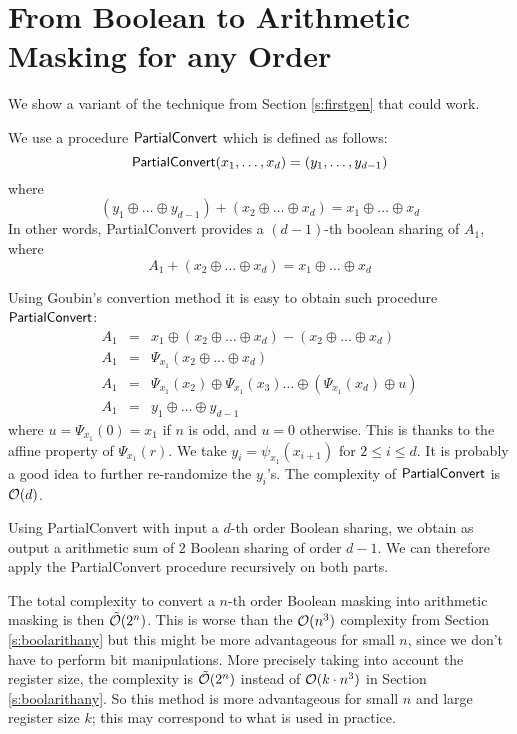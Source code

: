 \documentclass[11pt]{llncs}
\begin{document}
\section{From Boolean to Arithmetic Masking for any Order}

We show a variant of the technique from Section \ref{s:firstgen} that
could work.

We use a procedure ${\sf PartialConvert}$ which is defined as follows:
$${\sf PartialConvert}(x_1,\ldots,x_d)=(y_1,\ldots,y_{d-1})$$
where
$$ (y_1 \oplus \ldots \oplus y_{d-1}) + (x_2 \oplus \ldots \oplus
x_d)=x_1 \oplus \ldots \oplus x_d$$
In other words, {\sf PartialConvert} provides a $(d-1)$-th boolean sharing of
$A_1$, where 
$$A_1 +  (x_2 \oplus \ldots \oplus
x_d)=x_1 \oplus \ldots \oplus x_d$$


Using Goubin's convertion method it is easy to obtain such procedure
${\sf PartialConvert}$:
\begin{eqnarray*}
A_1 & = & x_1 \oplus (x_2 \oplus \ldots \oplus x_d) - (x_2 \oplus \ldots
\oplus x_d) \\
A_1 & = & \Psi_{x_1}(x_2 \oplus \ldots \oplus x_d) \\
A_1 & = & \Psi_{x_1}(x_2) \oplus \Psi_{x_1}(x_3) \ldots \oplus
(\Psi_{x_1}(x_d) \oplus u) \\
A_1 & = & y_1 \oplus \ldots \oplus y_{d-1}
\end{eqnarray*}
where $u=\Psi_{x_1}(0)=x_1$ if $n$ is odd, and $u=0$ otherwise. This
is thanks to the affine property of $\Psi_{x_1}(r)$. We take
$y_i=\psi_{x_1}(x_{i+1})$ for $2 \leq i \leq d$. It is probably a good
idea to further re-randomize the $y_i$'s. The complexity of ${\sf
  PartialConvert}$ is ${\cal O}(d)$.

Using {\sf PartialConvert} with input a $d$-th order Boolean
sharing, we obtain as output a arithmetic sum of $2$ Boolean sharing
of order $d-1$. We can therefore apply the {\sf PartialConvert}
procedure recursively on both parts.

The total complexity to convert a $n$-th order Boolean masking into
arithmetic masking is then
$\tilde{ \cal O}(2^n)$. This is worse than the ${\cal O}(n^3)$
complexity from
Section \ref{s:boolarithany} but this might be more advantageous for
small $n$, since we don't have to perform bit manipulations. More precisely
taking into account the register size, the complexity is $\tilde{ \cal
  O}(2^n)$ instead of ${\cal O}(k \cdot n^3)$ in Section
\ref{s:boolarithany}.  So this method is more
advantageous for small $n$ and large register size $k$; this may
correspond to what is used in practice.
\end{document}
